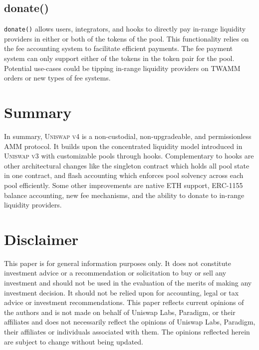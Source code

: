 \documentclass[sigconf,nonacm,prologue,table]{acmart}
\numberwithin{equation}{section}
\theoremstyle{definition}
\theoremstyle{remark}
\begin{document}
\subsection{donate()}
\verb|donate()| allows users, integrators, and hooks to directly pay in-range liquidity providers in either or both of the tokens of the pool. This functionality relies on the fee accounting system to facilitate efficient payments. The fee payment system can only support either of the tokens in the token pair for the pool. Potential use-cases could be tipping in-range liquidity providers on TWAMM orders or new types of fee systems.

\section{Summary}
In summary, \textsc{Uniswap v4} is a non-custodial, non-upgradeable, and permissionless AMM protocol. It builds upon the concentrated liquidity model introduced in \textsc{Uniswap v3} with customizable pools through hooks. Complementary to hooks are other architectural changes like the singleton contract which holds all pool state in one contract, and flash accounting which enforces pool solvency across each pool efficiently. Some other improvements are native ETH support, ERC-1155 balance accounting, new fee mechanisms, and the ability to donate to in-range liquidity providers.




\section*{Disclaimer}

This paper is for general information purposes only. It does not constitute investment advice or a recommendation or solicitation to buy or sell any investment and should not be used in the evaluation of the merits of making any investment decision. It should not be relied upon for accounting, legal or tax advice or investment recommendations.  This paper reflects current opinions of the authors and is not made on behalf of Uniswap Labs, Paradigm, or their affiliates and does not necessarily reflect the opinions of Uniswap Labs, Paradigm, their affiliates or individuals associated with them. The opinions reflected herein are subject to change without being updated. 
\end{document}
